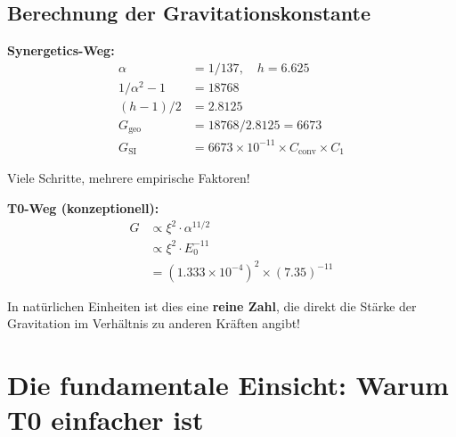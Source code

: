 \documentclass[12pt,a4paper]{article}
\newcommand{\xipar}{\xi}
\begin{document}
	\subsection{Berechnung der Gravitationskonstante}
	
	\textbf{Synergetics-Weg:}
	\begin{align}
		\alpha &= 1/137, \quad h = 6.625 \\
		1/\alpha^2 - 1 &= 18768 \\
		(h-1)/2 &= 2.8125 \\
		G_{\text{geo}} &= 18768 / 2.8125 = 6673 \\
		G_{\text{SI}} &= 6673 \times 10^{-11} \times C_{\text{conv}} \times C_1
	\end{align}
	
	Viele Schritte, mehrere empirische Faktoren!
	
	\textbf{T0-Weg (konzeptionell):}
	\begin{align}
		G &\propto \xipar^2 \cdot \alpha^{11/2} \\
		&\propto \xipar^2 \cdot E_0^{-11} \\
		&= (1.333 \times 10^{-4})^2 \times (7.35)^{-11}
	\end{align}
	
	In natürlichen Einheiten ist dies eine \textbf{reine Zahl}, die direkt die Stärke der Gravitation im Verhältnis zu anderen Kräften angibt!
	
	\section{Die fundamentale Einsicht: Warum T0 einfacher ist}
	
\end{document}
